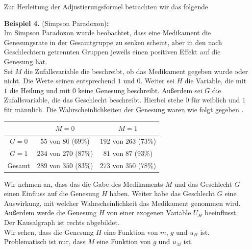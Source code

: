 \documentclass[headsepline,11pt,bibliography=leveldown]{scrbook}
\newcounter{NewZaehler}
\newcommand{\NewZahl}{\refstepcounter{NewZaehler}4.\theNewZaehler}
\newenvironment{NewBeispiel}[1]{\par\medskip\textbf{Beispiel \NewZahl} #1\textbf{:}\\}{\par\medskip}
\begin{document}
Zur Herleitung der Adjustierungsformel betrachten wir das folgende
\begin{NewBeispiel}{(Simpson Paradoxon)\cite[S. 1ff, S. 55 - 58]{Primer}}
Im Simpson Paradoxon wurde beobachtet, dass eine Medikament die Genesungsrate in der Gesamtgruppe zu senken scheint, aber in den nach Geschlechtern getrennten Gruppen jeweils einen positiven Effekt auf die Genesung hat.\\

Sei $M$ die Zufallsvariable die beschreibt, ob das Medikament gegeben wurde oder nicht. Die Werte seinen entsprechend $1$ und $0$. Weiter sei $H$ die Variable, die mit $1$ die Heilung und mit $0$ keine Genesung beschreibt. Außerdem sei $G$ die Zufallsvariable, die das Geschlecht beschreibt. Hierbei stehe $0$ für weiblich und $1$ für männlich. Die Wahrscheinlichkeiten der Genesung waren wie folgt gegeben \cite[S. 2]{Primer}.
\begin{center}
\begin{tabular}{| c | c | c |}
\hline
& $M = 0$ & $M = 1$\\
\hline
$G = 0$ & $55$ von $80$ ($69 \%$) & $192$ von $263$ ($73 \%$)\\
\hline
$G = 1$ & $234$ von $270$ ($87 \%$) & $81$ von $87$ ($93 \%$)\\
\hline
Gesamt & $289$ von $350$ ($83 \%$) & $273$ von $350$ ($78 \%$)\\
\hline
\end{tabular}
\end{center}

\begin{minipage}{0.5\linewidth}
Wir nehmen an, dass das die Gabe des Medikaments $M$ und das Geschlecht $G$ einen Einfluss auf die Genesung $H$ haben. Weiter habe das Geschlecht $G$ eine Auswirkung, mit welcher Wahrscheinlichkeit das Medikament genommen wird. Außerdem werde die Genesung $H$ von einer exogenen Variable $U_H$ beeinflusst. Der Kausalgraph ist rechts abgebildet.\\
Wir sehen, dass die Genesung $H$ eine Funktion von $m$, $g$ und $u_H$ ist. Problematisch ist nur, dass $M$ eine Funktion von $g$ und $u_M$ ist.\\
\end{minipage}
\begin{minipage}{0.5\linewidth}
\begin{center}
\end{center}
\end{minipage}
\end{NewBeispiel}
\end{document}

